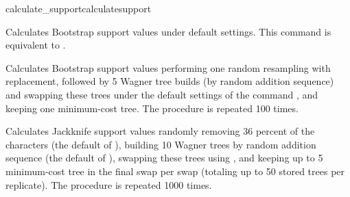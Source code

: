 \begin{command}{calculate\_support}{calculatesupport}
\begin{poyexamples}
         {Calculates Bootstrap support values under default settings. This command
         is equivalent to .}
	
            {Calculates Bootstrap support values performing one random resampling with
            replacement, followed by 5 Wagner tree builds (by random addition sequence)
            and swapping these trees under the default settings of the command 
            , and keeping one minimum-cost tree. The procedure
            is repeated 100 times.}
        
            {Calculates Jackknife support values randomly removing 36 percent of the
            characters (the default of ), building 10
            Wagner trees by random addition sequence (the default of
            ), swapping these trees using ,
            and keeping up to 5 minimum-cost tree in the
            final swap per swap (totaling up to 50 stored trees per replicate). 
            The procedure is repeated 1000 times.}

	\end{poyexamples}
            
	\begin{poyalso}
	\end{poyalso}

\end{command}


